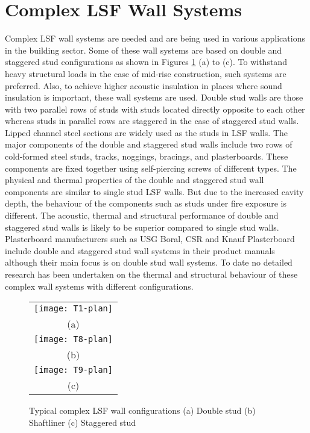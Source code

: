 \section{Complex LSF Wall Systems}
Complex LSF wall systems are needed and are being used in various applications in the building sector. Some of these wall systems are based on double and staggered stud configurations as shown in Figures \ref{fig:typical-complex} (a) to (c). To withstand heavy structural loads in the case of mid-rise construction, such systems are preferred. Also, to achieve higher acoustic insulation in places where sound insulation is important, these wall systems are used. Double stud walls are those with two parallel rows of studs with studs located directly opposite to each other whereas studs in parallel rows are staggered in the case of staggered stud walls. Lipped channel steel sections are widely used as the studs in LSF walls. The major components of the double and staggered stud walls include two rows of cold-formed steel studs, tracks, noggings, bracings, and plasterboards. These components are fixed together using self-piercing screws of different types. The physical and thermal properties of the double and staggered stud wall components are similar to single stud LSF walls. But due to the increased cavity depth, the behaviour of the components such as studs under fire exposure is different. The acoustic, thermal and structural performance of double and staggered stud walls is likely to be superior compared to single stud walls. Plasterboard manufacturers such as USG Boral, CSR and Knauf Plasterboard include double and staggered stud wall systems in their product manuals although their main focus is on double stud wall systems. To date no detailed research has been undertaken on the thermal and structural behaviour of these complex wall systems with different configurations. 
\begin{figure}[!htbp]
	\centering
		\begin{tabular}{c}
			\texttt{[image: T1-plan]} \\
			(a) \\
			\texttt{[image: T8-plan]} \\ 
			(b)  \\ 
			\texttt{[image: T9-plan]} \\ 
			(c)  \\ 
		\end{tabular} 
		\caption{Typical complex LSF wall configurations (a) Double stud (b) Shaftliner (c) Staggered stud }
		\label{fig:typical-complex}
\end{figure}

